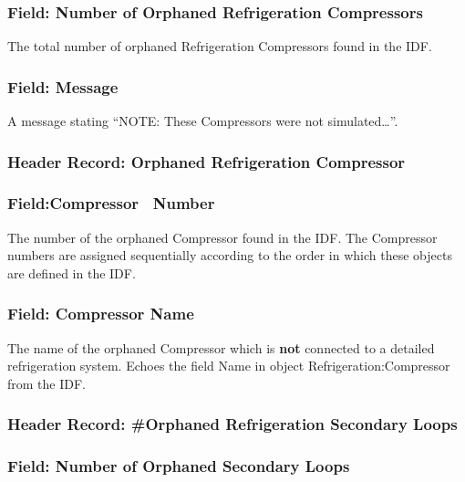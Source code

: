 \subsubsection{Field: Number of Orphaned Refrigeration Compressors}\label{field-number-of-orphaned-refrigeration-compressors}

The total number of orphaned Refrigeration Compressors found in the IDF.

\subsubsection{Field: Message}\label{field-message-2}

A message stating ``NOTE: These Compressors were not simulated\ldots{}''.

\subsubsection{Header Record: Orphaned Refrigeration Compressor}\label{header-record-orphaned-refrigeration-compressor}

\subsubsection{Field:Compressor ~Number}\label{fieldcompressor-number}

The number of the orphaned Compressor found in the IDF. The Compressor numbers are assigned sequentially according to the order in which these objects are defined in the IDF.

\subsubsection{Field: Compressor Name}\label{field-compressor-name-1}

The name of the orphaned Compressor which is \textbf{not} connected to a detailed refrigeration system. Echoes the field Name in object Refrigeration:Compressor from the IDF.

\subsubsection{Header Record: \#Orphaned Refrigeration Secondary Loops}\label{header-record-orphaned-refrigeration-secondary-loops}

\subsubsection{Field: Number of Orphaned Secondary Loops}\label{field-number-of-orphaned-secondary-loops}

